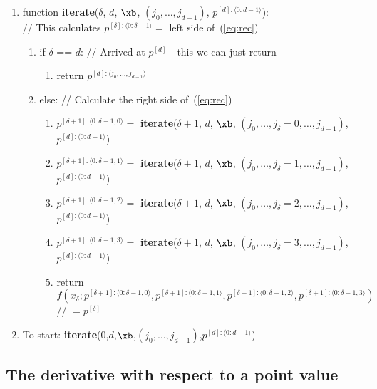 \documentclass[11pt]{article}
\begin{document}
\begin{enumerate}
\item function \textbf{iterate}($\delta$, $d$, $\xb$, $(j_0, \dots, j_{d-1})$, $p^{[d]:\langle 0:d-1 \rangle}$): \\
// This calculates $p^{[\delta]: \langle 0:\delta-1 \rangle} = $ left side of~(\ref{eq:rec})
\begin{enumerate}
\item if $\delta$ == $d$: // Arrived at $p^{[d]}$ - this we can just return
\begin{enumerate}
\item return $p^{[d]: \langle j_0, \dots, j_{d-1} \rangle}$
\end{enumerate}
\item else: // Calculate the right side of~(\ref{eq:rec})
\begin{enumerate}
\item $p^{[\delta+1]: \langle 0: \delta-1,0 \rangle} = $ \textbf{iterate}($\delta+1$, $d$, $\xb$, $( j_0, \dots, j_{\delta}=0, \dots, j_{d-1} )$, $p^{[d]:\langle 0:d-1 \rangle}$)
\item $p^{[\delta+1]: \langle 0: \delta-1,1 \rangle} = $ \textbf{iterate}($\delta+1$, $d$, $\xb$, $( j_0, \dots, j_{\delta}=1, \dots, j_{d-1} )$, $p^{[d]:\langle 0:d-1 \rangle}$)
\item $p^{[\delta+1]: \langle 0: \delta-1,2 \rangle} = $ \textbf{iterate}($\delta+1$, $d$, $\xb$, $( j_0, \dots, j_{\delta}=2, \dots, j_{d-1} )$, $p^{[d]:\langle 0:d-1 \rangle}$)
\item $p^{[\delta+1]: \langle 0: \delta-1,3 \rangle} = $ \textbf{iterate}($\delta+1$, $d$, $\xb$, $( j_0, \dots, j_{\delta}=3, \dots, j_{d-1} )$, $p^{[d]:\langle 0:d-1 \rangle}$)
\item return $f \left ( 
x_{\delta} ; 
p^{[\delta+1]: \langle 0:\delta-1,0 \rangle},
p^{[\delta+1]: \langle 0:\delta-1,1 \rangle},
p^{[\delta+1]: \langle 0:\delta-1,2 \rangle},
p^{[\delta+1]: \langle 0:\delta-1,3 \rangle}
\right ) $ // $= p^{[\delta]}$
\end{enumerate}
\end{enumerate}

\item To start: \textbf{iterate}(0,$d$,$\xb$,$(j_0,\dots,j_{d-1})$,$p^{[d]:\langle 0:d-1 \rangle}$)
\end{enumerate}


\subsection{The derivative with respect to a point value}
\end{document}
